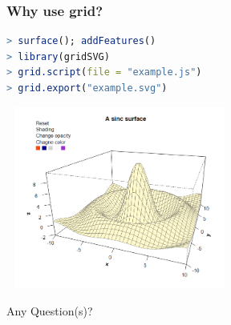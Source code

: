 \documentclass{beamer}
\begin{document}
\begin{frame}[fragile]
\frametitle{Why use \textbf{grid}?}

\begin{lstlisting}[language = R]
> surface(); addFeatures()
> library(gridSVG)
> grid.script(file = "example.js")
> grid.export("example.svg")

\end{lstlisting}

\begin{center}
  \includegraphics[height = 6cm, width = 7.5cm]{plot/origin_1.PNG}
\end{center}

\end{frame}


\begin{frame}[fragile]

\begin{center}
\Huge Any Question(s)?
\end{center}


\end{frame}
\end{document}
